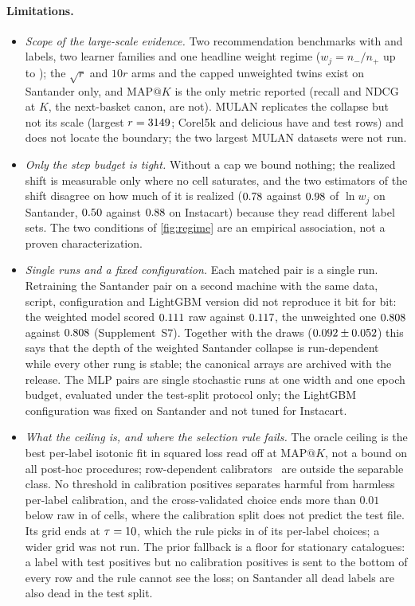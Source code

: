 \documentclass[sigconf,nonacm]{acmart}
\makeatletter
\newcommand{\mapk}{\mathrm{MAP}@K\xspace}
\newcommand{\Supp}[1]{Supplement~#1}  %
\makeatother
\begin{document}
\paragraph{Limitations.}
\begin{itemize}[leftmargin=*,nosep]
\item \emph{Scope of the large-scale evidence.} Two recommendation benchmarks with \nnLabels{} and \nInLabels{} labels, two learner families and one headline weight regime ($w_j=n_-/n_+$ up to \nwMax); the $\sqrt{r}$ and $10r$ arms and the capped unweighted twins exist on Santander only, and $\mapk$ is the only metric reported (recall and NDCG at $K$, the next-basket canon, are not). MULAN replicates the collapse but not its scale (largest $r=3149$; Corel5k and delicious have \ncorelNtestDose{} and \ndelNtestDose{} test rows) and does not locate the boundary; the two largest MULAN datasets were not run.
\item \emph{Only the step budget is tight.} Without a cap we bound nothing; the realized shift is measurable only where no cell saturates, and the two estimators of the shift disagree on how much of it is realized ($0.78$ against $0.98$ of $\ln w_j$ on Santander, $0.50$ against $0.88$ on Instacart) because they read different label sets. The two conditions of \cref{fig:regime} are an empirical association, not a proven characterization.
\item \emph{Single runs and a fixed configuration.} Each matched pair is a single run. Retraining the Santander pair on a second machine with the same data, script, configuration and LightGBM version did not reproduce it bit for bit: the weighted model scored $0.111$ raw against $0.117$, the unweighted one $0.808$ against $0.808$ (\Supp{S7}). Together with the \nseedN{} draws ($0.092 \pm 0.052$) this says that the depth of the weighted Santander collapse is run-dependent while every other rung is stable; the canonical arrays are archived with the release. The MLP pairs are single stochastic runs at one width and one epoch budget, evaluated under the test-split protocol only; the LightGBM configuration was fixed on Santander and not tuned for Instacart.
\item \emph{What the ceiling is, and where the selection rule fails.} The oracle ceiling is the best per-label isotonic fit in squared loss read off at $\mapk$, not a bound on all post-hoc procedures; row-dependent calibrators~\cite{Rahimi2020IntraOrder} are outside the separable class. No threshold in calibration positives separates harmful from harmless per-label calibration, and the cross-validated choice ends more than $0.01$ below raw in \nnTauSelBelowRaw{} of \nnTauCells{} cells, where the calibration split does not predict the test file. Its grid ends at $\tau=10$, which the rule picks in \nnTauChoiceMaxTau{} of its \nnTauChoicePerLabel{} per-label choices; a wider grid was not run. The prior fallback is a floor for stationary catalogues: a label with test positives but no calibration positives is sent to the bottom of every row and the rule cannot see the loss; on Santander all \nnDeadCalAlsoTest{} dead labels are also dead in the test split.
\end{itemize}
\end{document}
